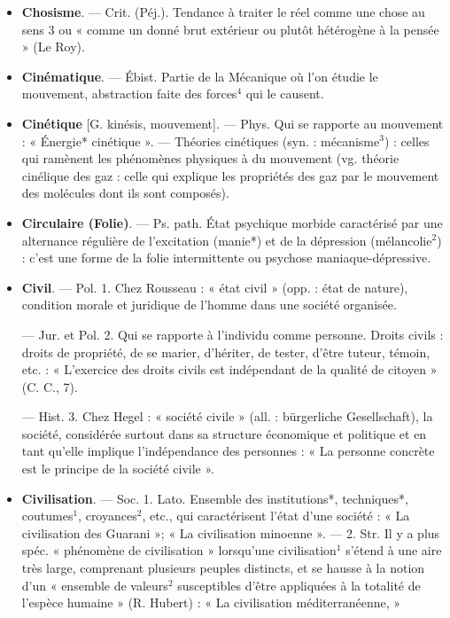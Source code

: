 \begin{itemize}[leftmargin=1cm, label=, itemsep=11pt]
\item {\bf Chosisme}. — Crit. (Péj.). Tendance à
traiter le réel comme une chose au
sens 3 ou « comme un donné brut
extérieur ou plutôt hétérogène à la
pensée » (Le Roy).

\item {\bf Cinématique}. — Ébist. Partie de la
Mécanique où l’on étudie le mouvement, abstraction faite des forces$^4$
qui le causent.

\item {\bf Cinétique} [G. kinésis, mouvement]. —
Phys. Qui se rapporte au mouvement : « Énergie* cinétique ». —
Théories cinétiques (syn. : mécanisme$^3$) : celles qui ramènent les
phénomènes physiques à du mouvement (vg. théorie cinélique des gaz :
celle qui explique les propriétés des
gaz par le mouvement des molécules
dont ils sont composés).

\item {\bf Circulaire (Folie)}. — Ps. path. État
psychique morbide caractérisé par
une alternance régulière de l’excitation (manie*) et de la dépression
(mélancolie$^2$) : c’est une forme de la
folie intermittente ou psychose maniaque-dépressive.

\item {\bf Civil}. — Pol. 1. Chez Rousseau : « état
civil » (opp. : état de nature), condition morale et juridique de l’homme
dans une société organisée.

— Jur. et Pol. 2. Qui se rapporte
à l'individu comme personne. Droits
civils : droits de propriété, de se
marier, d’hériter, de tester, d’être
tuteur, témoin, etc. : « L'exercice
des droits civils est indépendant de
la qualité de citoyen » (C. C., 7).

— Hist. 3. Chez Hegel : « société
civile » (all. : bürgerliche Gesellschaft),
la société, considérée surtout dans
sa structure économique et politique
et en tant qu’elle implique l’indépendance des personnes : « La personne concrète est le principe de la
société civile ».

\item {\bf Civilisation}. — Soc. 1. Lato. Ensemble
des institutions*, techniques*, coutumes$^1$, croyances$^2$, etc., qui caractérisent l’état d’une société : « La
civilisation des Guarani »; « La
civilisation minoenne ». — 2. Str.
Il y a plus spéc. « phénomène de
civilisation » lorsqu'une civilisation$^1$
s’étend à une aire très large, comprenant plusieurs peuples distincts, et
se hausse à la notion d’un « ensemble
de valeurs$^2$ susceptibles d’être appliquées à la totalité de l'espèce
humaine » (R. Hubert) : « La civilisation méditerranéenne, »


\end{itemize}

